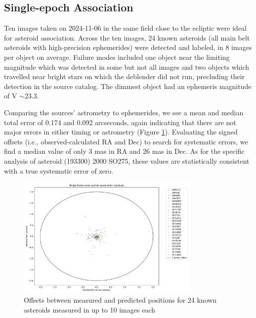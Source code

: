 \subsection{Single-epoch Association}
\label{sec:association}

Ten images taken on 2024-11-06 in the same field close to the ecliptic were ideal for asteroid association. Across the ten images, 24 known asteroids (all main belt asteroids with high-precision ephemerides) were detected and labeled, in 8 images per object on average. Failure modes included one object near the limiting magnitude which was detected in some but not all images and two objects which travelled near bright stars on which the deblender did not run, precluding their detection in the source catalog. The dimmest object had an ephemeris magnitude of V $\sim$23.3. 

Comparing the sources' astrometry to ephemerides,  we see a mean and median total error of 0.174 and 0.092 arcseconds, again indicating that there are not major errors in either timing or astrometry (Figure \ref{fig:resid01}). Evaluating the signed offsets (i.e., observed-calculated RA and Dec) to search for systematic errors, we find a median value of only 3 mas in RA and 26 mas in Dec. As for the specific analysis of asteroid (193300) 2000 SO275, these values are statistically consistent with a true systematic error of zero.

\begin{figure}
\includegraphics[width=3.5in]{sfa_resid-2.pdf}
\caption{Offsets between measured and predicted positions for 24 known asteroids measured in up to 10 images each \label{fig:resid01}}
\end{figure}





